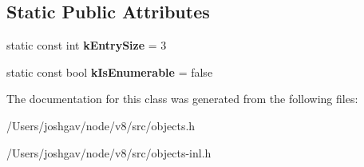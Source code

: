 \subsection*{Static Public Attributes}
\begin{DoxyCompactItemize}
\item 
static const int {\bfseries k\+Entry\+Size} = 3\hypertarget{classv8_1_1internal_1_1_number_dictionary_shape_a9076ec00745caf9bf124186dff62ea96}{}\label{classv8_1_1internal_1_1_number_dictionary_shape_a9076ec00745caf9bf124186dff62ea96}

\item 
static const bool {\bfseries k\+Is\+Enumerable} = false\hypertarget{classv8_1_1internal_1_1_number_dictionary_shape_a2286539ca5d3e61f5fddfb1c5f44a7cd}{}\label{classv8_1_1internal_1_1_number_dictionary_shape_a2286539ca5d3e61f5fddfb1c5f44a7cd}

\end{DoxyCompactItemize}


The documentation for this class was generated from the following files\+:\begin{DoxyCompactItemize}
\item 
/\+Users/joshgav/node/v8/src/objects.\+h\item 
/\+Users/joshgav/node/v8/src/objects-\/inl.\+h\end{DoxyCompactItemize}
